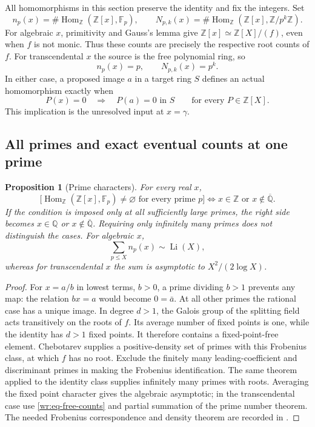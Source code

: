\documentclass[11pt,a4paper]{article}
\newcommand{\Q}{\mathbb Q}
\newcommand{\Z}{\mathbb Z}
\newcommand{\Qbar}{\overline{\mathbb Q}}
\newtheorem{proposition}[theorem]{Proposition}
\theoremstyle{definition}
\theoremstyle{remark}
\numberwithin{equation}{section}
\begin{document}
All homomorphisms in this section preserve the identity and fix the
integers. Set
\[
 n_p(x)=\#\operatorname{Hom}_\Z(\Z[x],\mathbb F_p),\qquad
 N_{p,k}(x)=\#\operatorname{Hom}_\Z(\Z[x],\Z/p^k\Z).
\]
For algebraic \(x\), primitivity and Gauss's lemma give
\(\Z[x]\simeq\Z[X]/(f)\), even when \(f\) is not monic. Thus these
counts are precisely the respective root counts of \(f\). For
transcendental \(x\) the source is the free polynomial ring, so
\begin{equation}\label{wr:eq-free-counts}
 n_p(x)=p,\qquad N_{p,k}(x)=p^k.
\end{equation}
In either case, a proposed image \(a\) in a target ring \(S\) defines an
actual homomorphism exactly when
\begin{equation}\label{wr:eq-relation-preservation}
 P(x)=0\quad\Longrightarrow\quad P(a)=0\text{ in }S
 \qquad\text{for every }P\in\Z[X].
\end{equation}
This implication is the unresolved input at \(x=\gamma\).

\subsection{All primes and exact eventual counts at one prime}

\begin{proposition}[Prime characters]\label{wr:prop-prime-characters}
For every real \(x\),
\[
 \bigl[\operatorname{Hom}_\Z(\Z[x],\mathbb F_p)\ne\varnothing
       \text{ for every prime }p\bigr]
 \Longleftrightarrow x\in\Z\text{ or }x\notin\Qbar.
\]
If the condition is imposed only at all sufficiently large primes, the
right side becomes \(x\in\Q\) or \(x\notin\Qbar\). Requiring only
infinitely many primes does not distinguish the cases.
For algebraic \(x\),
\[
 \sum_{p\le X}n_p(x)\sim\operatorname{Li}(X),
\]
whereas for transcendental \(x\) the sum is asymptotic to
\(X^2/(2\log X)\).
\end{proposition}
\begin{proof}
For \(x=a/b\) in lowest terms, \(b>0\), a prime dividing \(b>1\)
prevents any map: the relation \(bx=a\) would become \(0=\bar a\).
At all other primes the rational case has a unique image. In degree
\(d>1\), the Galois group of the splitting field acts transitively on
the roots of \(f\). Its average number of fixed points is one, while
the identity has \(d>1\) fixed points. It therefore contains a
fixed-point-free element. Chebotarev supplies a positive-density set of
primes with this Frobenius class, at which \(f\) has no root. Exclude
the finitely many leading-coefficient and discriminant primes in making
the Frobenius identification. The same theorem applied to the identity
class supplies infinitely many primes with roots. Averaging the fixed
point character gives the algebraic asymptotic; in the transcendental
case use \eqref{wr:eq-free-counts} and partial summation of the prime
number theorem. The needed Frobenius correspondence and density theorem
are recorded in \cite{wr:milne,wr:ekt}.
\end{proof}
\end{document}
